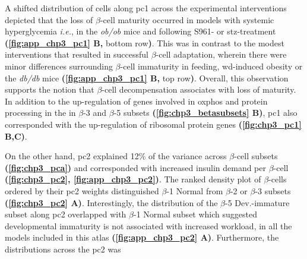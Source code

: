 \par A shifted distribution of cells along \gls{pc}1 across the experimental interventions depicted that the loss of $\beta$-cell maturity occurred in models with systemic hyperglycemia \textit{i.e.}, in the \textit{ob/ob} mice and following S961- or \gls{stz}-treatment \textbf{(\autoref{fig:app_chp3_pc1} B,} bottom row\textbf{)}. This was in contrast to the modest interventions that resulted in successful $\beta$-cell adaptation, wherein there were minor differences surrounding $\beta$-cell immaturity in feeding, \gls{wd}-induced obesity or the \textit{db/db} mice \textbf{(\autoref{fig:app_chp3_pc1} B,} top row\textbf{)}. Overall, this observation supports the notion that $\beta$-cell decompensation associates with loss of maturity. In addition to the up-regulation of genes involved in \gls{oxphos} and protein processing in the  in $\beta$-3 and $\beta$-5 subsets \textbf{(\autoref{fig:chp3_betasubsets} B)}, \gls{pc}1 also corresponded with the up-regulation of ribosomal protein genes \textbf{(\autoref{fig:chp3_pc1} B,C)}.\\ %


\par On the other hand, \gls{pc}2 explained 12\% of the variance across $\beta$-cell subsets \textbf{(\autoref{fig:chp3_pca})} and corresponded with increased insulin demand per $\beta$-cell \textbf{(\autoref{fig:chp3_pc2}, \autoref{fig:app_chp3_pc2})}. The ranked density plot of $\beta$-cells ordered by their \gls{pc}2 weights distinguished $\beta$-1 Normal from $\beta$-2 or $\beta$-3 subsets \textbf{(\autoref{fig:chp3_pc2} A)}. Interestingly, the distribution of the $\beta$-5 Dev.-immature subset along \gls{pc}2 overlapped with $\beta$-1 Normal subset which suggested developmental immaturity is not associated with increased workload, in all the models included in this atlas \textbf{(\autoref{fig:app_chp3_pc2} A)}. Furthermore, the distributions across the \gls{pc}2 was 

